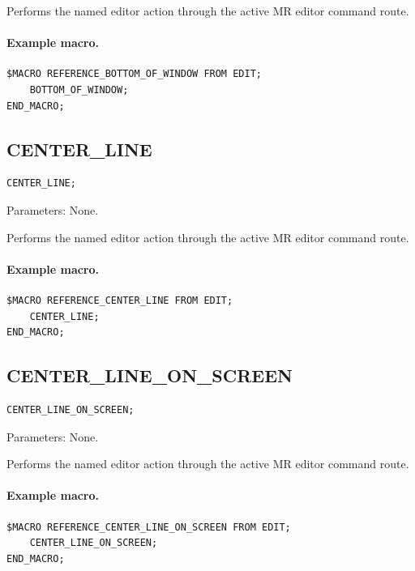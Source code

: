 \documentclass[a4paper,10pt,twoside,openany]{book}
\begin{document}
Performs the named editor action through the active MR editor command route.

\paragraph{Example macro.}
\begin{verbatim}
$MACRO REFERENCE_BOTTOM_OF_WINDOW FROM EDIT;
    BOTTOM_OF_WINDOW;
END_MACRO;
\end{verbatim}

\label{prim:procedure-center-line}
\subsection*{CENTER\_LINE}
\begin{verbatim}
CENTER_LINE;
\end{verbatim}
Parameters: None.

Performs the named editor action through the active MR editor command route.

\paragraph{Example macro.}
\begin{verbatim}
$MACRO REFERENCE_CENTER_LINE FROM EDIT;
    CENTER_LINE;
END_MACRO;
\end{verbatim}

\label{prim:procedure-center-line-on-screen}
\subsection*{CENTER\_LINE\_ON\_SCREEN}
\begin{verbatim}
CENTER_LINE_ON_SCREEN;
\end{verbatim}
Parameters: None.

Performs the named editor action through the active MR editor command route.

\paragraph{Example macro.}
\begin{verbatim}
$MACRO REFERENCE_CENTER_LINE_ON_SCREEN FROM EDIT;
    CENTER_LINE_ON_SCREEN;
END_MACRO;
\end{verbatim}

\label{prim:procedure-down}
\end{document}
